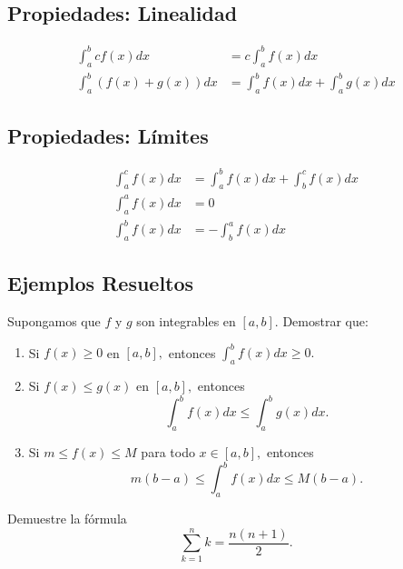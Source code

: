 	\subsection{Propiedades: Linealidad}
	\begin{align}
		\label{ayr:23.3}
		\int_{a}^{b} c f(x)dx&=c \int_{a}^{b}f(x)dx \\
		\label{ayr:23.5}
		\int_{a}^{b} \left( f(x)+g(x) \right)dx&= \int_{a}^{b}f(x)dx + \int_{a}^{b}g(x)dx
	\end{align}
	



	\subsection{Propiedades: Límites}
	\begin{align}
		\label{ayr:23.7}
		\int_{a}^{c}f(x)dx&=\int_{a}^{b}f(x)dx
		+\int_{b}^{c}f(x)dx\\		
		\label{ayr:23.7.i}
		\int_{a}^{a}f(x)dx&=0\\		
		\label{ayr:23.7.ii}
		\int_{a}^{b}f(x)dx&=-\int_{b}^{a}f(x)dx
	\end{align}
	


\subsection{Ejemplos Resueltos}


	\begin{problema}
		Supongamos que $f$ y $g$ son integrables en $[a,b].$ Demostrar que:
		\begin{enumerate}
			\item Si $f(x)\geq 0$ en $[a,b],$ entonces $\int_{a}^{b}f(x)dx\geq 0.$
			\item Si $f(x) \leq g(x)$ en $[a,b],$ entonces
			$$
			\int_{a}^{b}f(x)dx \leq \int_{a}^{b}g(x)dx.
			$$
			\item Si $m\leq f(x) \leq M$ para todo $x\in [a,b],$ entonces
			$$
			m\left( b-a \right) \leq \int_{a}^{b}f(x)dx
			\leq M\left( b-a \right).
			$$
		\end{enumerate}
	\end{problema}



	



	\begin{problema}
		\label{ayr:solved:23.5}
		Demuestre la fórmula
		$$
		\sum_{k=1}^{n}k=\dfrac{n\left( n+1 \right)}{2}.
		$$
	\end{problema}
	
